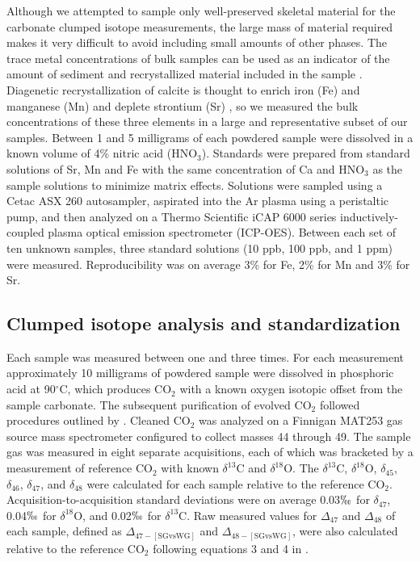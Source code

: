 \documentclass[5p, authoryear]{elsarticle}
\begin{document}
Although we attempted to sample only well-preserved skeletal material for the carbonate clumped isotope measurements, the large mass of material required makes it very difficult to avoid including small amounts of other phases. The trace metal concentrations of bulk samples can be used as an indicator of the amount of sediment and recrystallized material included in the sample \citep{Azmy1998, Brand2012, Came2007, Finnegan2011}. Diagenetic recrystallization of calcite is thought to enrich iron (Fe) and manganese (Mn) and deplete strontium (Sr) \citep{Brand1980, Shields2003}, so we measured the bulk concentrations of these three elements in a large and representative subset of our samples. Between 1 and 5 milligrams of each powdered sample were dissolved in a known volume of 4\% nitric acid (HNO$_3$). Standards were prepared from standard solutions of Sr, Mn and Fe with the same concentration of Ca and HNO$_3$ as the sample solutions to minimize matrix effects. Solutions were sampled using a Cetac ASX 260 autosampler, aspirated into the Ar plasma using a peristaltic pump, and then analyzed on a Thermo Scientific iCAP 6000 series inductively-coupled plasma optical emission spectrometer (ICP-OES). Between each set of ten unknown samples, three standard solutions (10 ppb, 100 ppb, and 1 ppm) were measured. Reproducibility was on average 3\% for Fe, 2\% for Mn and 3\% for Sr. 

\subsection{Clumped isotope analysis and standardization}

Each sample was measured between one and three times. For each measurement approximately 10 milligrams of powdered sample were dissolved in phosphoric acid at 90$^{\circ}$C, which produces CO$_2$ with a known oxygen isotopic offset from the sample carbonate. The subsequent purification of evolved CO$_2$ followed procedures outlined by \cite{Ghosh2006}. Cleaned CO$_2$ was analyzed on a Finnigan MAT253 gas source mass spectrometer configured to collect masses 44 through 49. The sample gas was measured in eight separate acquisitions, each of which was bracketed by a measurement of reference CO$_2$ with known $\delta^{13}$C and $\delta^{18}$O. The $\delta^{13}$C, $\delta^{18}$O, $\delta_{45}$, $\delta_{46}$, $\delta_{47}$, and $\delta_{48}$ were calculated for each sample relative to the reference CO$_2$. Acquisition-to-acquisition standard deviations were on average 0.03$\permil$ for $\delta_{47}$, 0.04$\permil$ for $\delta^{18}$O, and 0.02$\permil$ for $\delta^{13}$C. Raw measured values for $\Delta_{47}$ and $\Delta_{48}$ of each sample, defined as $\Delta_{47-[\text{SGvsWG}]}$ and $\Delta_{48-[\text{SGvsWG}]}$, were also calculated relative to the reference CO$_2$ following equations 3 and 4 in \cite{Huntington2009}.
\end{document}
